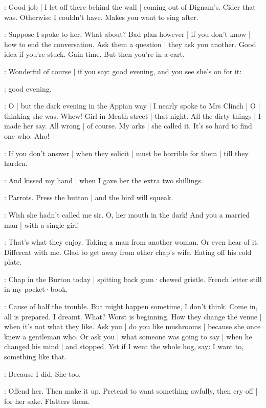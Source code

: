\BloomToday:
Good job |
I let off there behind the wall |
coming out of Dignam's.
Cider that was.
Otherwise I couldn't have.
Makes you want to sing after.

\BloomCurrent:
Suppose I spoke to her.
What about?
Bad plan however |
if you don't know |
how to end the conversation.
Ask them a question |
they ask you another.
Good idea
if you're stuck.
Gain time.
But then you're in a cart.

\BloomAbstract:
Wonderful of course |
if you say:
good evening,
and you see she's on for it:

\BloomOther:
good evening.

\BloomHist:
O |
but the dark evening in the Appian way |
I nearly spoke to Mrs Clinch |
O |
thinking she was.
Whew!
Girl in Meath street |
that night.
All the dirty things |
I made her say.
All wrong |
of course.
My arks |
she called it.
It's so hard to find one who.
Aho!

\BloomAbstract:
If you don't answer |
when they solicit |
must be horrible for them |%
till they harden.

\BloomHist:
And kissed my hand |
when I gave her the extra two shillings.

\BloomAbstract:
Parrots.
Press the button |
and the bird will squeak.

\BloomHist:
Wish she hadn't called me sir.
O,
her mouth in the dark!
And you a married man |
with a single girl!

\BloomAbstract:
That's what they enjoy.
Taking a man from another woman.
Or even hear of it.
Different with me.
Glad to get away from other chap's wife.
Eating off his cold plate.

\BloomToday:
Chap in the Burton today |
spitting back gum·chewed gristle.
French letter still in my pocket·book.

\BloomAbstract:
Cause of half the trouble.
But might happen sometime,
I don't think.
Come in,
all is prepared.
I dreamt.
What?
Worst is beginning.
How they change the venue |
when it's not what they like.%
Ask you |
do you like mushrooms |
because she once knew a gentleman who.
Or ask you |
what someone was going to say |
when he changed his mind |
and stopped.
Yet if I went the whole hog,
say:
I want to,
something like that.

\BloomCurrent:
Because I did.
She too.

\BloomAbstract:
Offend her.
Then make it up.
Pretend to want something awfully,
then cry off |
for her sake.
Flatters them.


